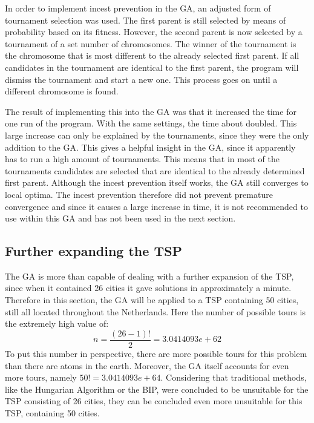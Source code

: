 \par
In order to implement incest prevention in the GA, an adjusted form of tournament selection was used. The first parent is still selected by means of probability based on its fitness. However, the second parent is now selected by a tournament of a set number of chromosomes. The winner of the tournament is the chromosome that is most different to the already selected first parent. If all candidates in the tournament are identical to the first parent, the program will dismiss the tournament and start a new one. This process goes on until a different chromosome is found. 

\par
The result of implementing this into the GA was that it increased the time for one run of the program. With the same settings, the time about doubled. This large increase can only be explained by the tournaments, since they were the only addition to the GA. This gives a helpful insight in the GA, since it apparently has to run a high amount of tournaments. This means that in most of the tournaments candidates are selected that are identical to the already determined first parent. Although the incest prevention itself works, the GA still converges to local optima. The incest prevention therefore did not prevent premature convergence and since it causes a large increase in time, it is not recommended to use within this GA and has not been used in the next section. 

\subsection{Further expanding the TSP}
\par
The GA is more than capable of dealing with a further expansion of the TSP, since when it contained 26 cities it gave solutions in approximately a minute. Therefore in this section, the GA will be applied to a TSP containing 50 cities, still all located throughout the Netherlands. Here the number of possible tours is the extremely high value of:
\[n = \frac{(26-1)!}{2} = 3.0414093e+62\]
To put this number in perspective, there are more possible tours for this problem than there are atoms in the earth. Moreover, the GA itself accounts for even more tours, namely $50! = 3.0414093e+64$. Considering that traditional methods, like the Hungarian Algorithm or the BIP, were concluded to be unsuitable for the TSP consisting of 26 cities, they can be concluded even more unsuitable for this TSP, containing 50 cities.

